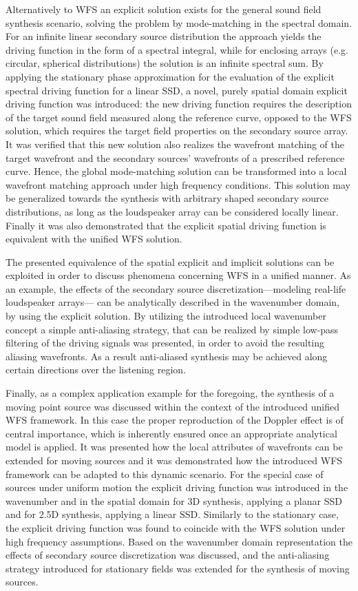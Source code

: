 Alternatively to WFS an explicit solution exists for the general sound field synthesis scenario, solving the problem by mode-matching in the spectral domain.
For an infinite linear secondary source distribution the approach yields the driving function in the form of a spectral integral, while for enclosing arrays (e.g. circular, spherical distributions) the solution is an infinite spectral sum.
By applying the stationary phase approximation for the evaluation of the explicit spectral driving function for a linear SSD, a novel, purely spatial domain explicit driving function was introduced: the new driving function requires the description of the target sound field measured along the reference curve, opposed to the WFS solution, which requires the target field properties on the secondary source array.
It was verified that this new solution also realizes the wavefront matching of the target wavefront and the secondary sources' wavefronts of a prescribed reference curve.
Hence, the global mode-matching solution can be transformed into a local wavefront matching approach under high frequency conditions.
This solution may be generalized towards the synthesis with arbitrary shaped secondary source distributions, as long as the loudspeaker array can be considered locally linear.
Finally it was also demonstrated that the explicit spatial driving function is equivalent with the unified WFS solution.

The presented equivalence of the spatial explicit and implicit solutions can be exploited in order to discuss phenomena concerning WFS in a unified manner.
As an example, the effects of the secondary source discretization---modeling real-life loudspeaker arrays--- can be analytically described in the wavenumber domain, by using the explicit solution.
By utilizing the introduced local wavenumber concept a simple anti-aliasing strategy, that can be realized by simple low-pass filtering of the driving signals was presented, in order to avoid the resulting aliasing wavefronts.
As a result anti-aliased synthesis may be achieved along certain directions over the listening region.

Finally, as a complex application example for the foregoing, the synthesis of a moving point source was discussed within the context of the introduced unified WFS framework.
In this case the proper reproduction of the Doppler effect is of central importance, which is inherently ensured once an appropriate analytical model is applied.
It was presented how the local attributes of wavefronts can be extended for moving sources and it was demonstrated how the introduced WFS framework can be adapted to this dynamic scenario.
For the special case of sources under uniform motion the explicit driving function was introduced in the wavenumber and in the spatial domain for 3D synthesis, applying a planar SSD and for 2.5D synthesis, applying a linear SSD.
Similarly to the stationary case, the explicit driving function was found to coincide with the WFS solution under high frequency assumptions.
Based on the wavenumber domain representation the effects of secondary source discretization was discussed, and the anti-aliasing strategy introduced for stationary fields was extended for the synthesis of moving sources.

